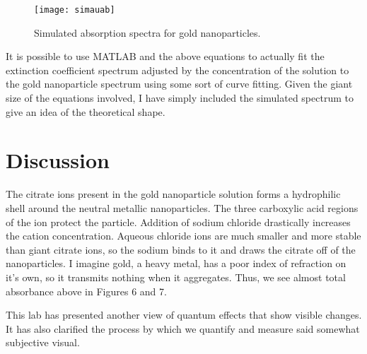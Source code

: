 \documentclass{article}
\begin{document}
\begin{figure}[H]
\texttt{[image: simauab]}
\centering
\caption{Simulated absorption spectra for gold nanoparticles.}
\end{figure}

It is possible to use MATLAB and the above equations to actually fit the extinction coefficient 
spectrum adjusted by the concentration of the solution to the gold nanoparticle spectrum
using some sort of curve fitting. Given the giant size of the equations involved, I have simply 
included the simulated spectrum to give an idea of the theoretical shape.

\section{Discussion}

The citrate ions present in the gold nanoparticle solution forms a hydrophilic shell around 
the neutral metallic nanoparticles. The three carboxylic acid regions of the ion protect
the particle. Addition of sodium chloride drastically increases the cation 
concentration. Aqueous chloride ions are much smaller and more stable 
than giant citrate ions, so the sodium binds to it and draws the 
citrate off of the nanoparticles. I imagine gold, a heavy metal, has a
poor index of refraction on it's own, so it transmits nothing when it
aggregates. Thus, we see almost total absorbance above in Figures 6 and 7.

This lab has presented another view of quantum effects that show visible changes. It has also 
clarified the process by which we quantify and measure said somewhat subjective visual.



\end{document}
